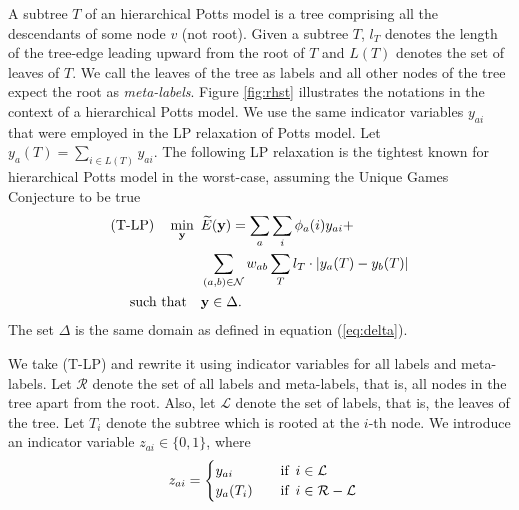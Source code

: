 A subtree $T$ of an hierarchical Potts model is a tree comprising all the descendants of some node $v$ (not root). Given a subtree $T$, $l_T$ denotes the length of the tree-edge leading upward from the root of $T$ and $L(T)$ denotes the set of leaves of $T$. We call the leaves of the tree as labels and all other nodes of the tree expect the root as \emph{meta-labels}. Figure \ref{fig:rhst} illustrates the notations in the context of a hierarchical Potts model.
%
 We use the same indicator variables $y_{ai}$ that were employed in the LP relaxation of Potts model. Let $y_a(T) = \sum_{i \in L(T)} y_{ai}$. The following LP relaxation is the tightest known for hierarchical Potts model in the worst-case, assuming the Unique Games Conjecture to be true \citep{manokaran2008sdp}
\begin{align}
\text{(T-LP)} \quad \min_{\bf y} \enskip & \widetilde{E}({\bf y}) =  \sum_{a} \sum_{i} \phi_a(i)y_{ai} + \nonumber\\
                                         &\sum_{(a, b) \in {\mathcal N}} w_{ab} \sum_T l_T \cdot |y_{a}(T) - y_{b}(T)| \nonumber\\
    \text{such that} \quad &{\bf y} \in \Delta.
\label{eq:t-lp}
\end{align}
The set $\Delta$ is the same domain as defined in equation (\ref{eq:delta}). 

 We take (T-LP) and rewrite it using indicator variables for all labels and meta-labels. Let $\mathcal R$ denote the set of all labels and meta-labels, that is, all nodes in the tree apart from the root. Also, let $\mathcal L$ denote the set of labels, that is, the leaves of the tree. Let $T_i$ denote the subtree which is rooted at the $i$-th node. We introduce an indicator variable $z_{ai} \in \{0, 1\}$, where
\begin{align}
    \enskip  z_{ai} =  \begin{cases} 
        y_{ai} \quad &\text{if} \enskip i \in {\mathcal L} \\
        y_{a}(T_i) \quad &\text{if} \enskip i \in {\mathcal R - \mathcal L} \\
    \end{cases}
\end{align}

